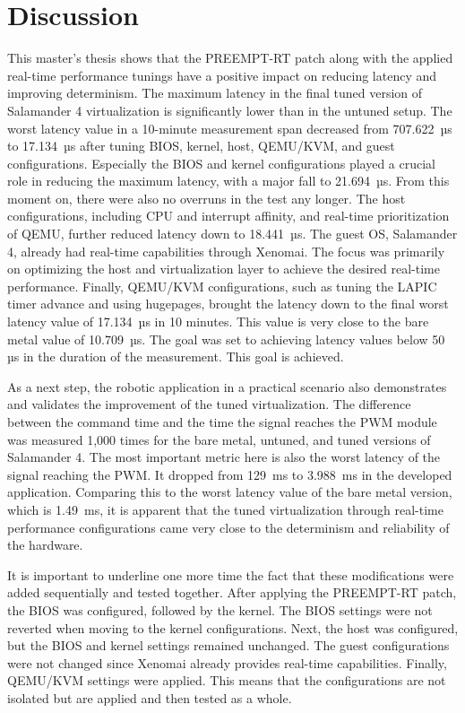 \documentclass[MMR,Master,english]{style/twbook}
\begin{document}
\clearpage

\chapter{Discussion}\label{cha:discussion}
This master's thesis shows that the PREEMPT-RT patch along with the applied real-time performance tunings have a positive impact on reducing latency and improving determinism. The maximum latency in the final tuned version of Salamander 4 virtualization is significantly lower than in the untuned setup. The worst latency value in a 10-minute measurement span decreased from 707.622~µs to 17.134~µs after tuning BIOS, kernel, host, QEMU/KVM, and guest configurations. Especially the BIOS and kernel configurations played a crucial role in reducing the maximum latency, with a major fall to 21.694~µs. From this moment on, there were also no overruns in the test any longer. The host configurations, including CPU and interrupt affinity, and real-time prioritization of QEMU, further reduced latency down to 18.441~µs. The guest OS, Salamander 4, already had real-time capabilities through Xenomai. The focus was primarily on optimizing the host and virtualization layer to achieve the desired real-time performance. Finally, QEMU/KVM configurations, such as tuning the LAPIC timer advance and using hugepages, brought the latency down to the final worst latency value of 17.134~µs in 10 minutes. This value is very close to the bare metal value of 10.709~µs. The goal was set to achieving latency values below 50 µs in the duration of the measurement. This goal is achieved.

\bigskip \noindent As a next step, the robotic application in a practical scenario also demonstrates and validates the improvement of the tuned virtualization. The difference between the command time and the time the signal reaches the PWM module was measured 1,000 times for the bare metal, untuned, and tuned versions of Salamander 4. The most important metric here is also the worst latency of the signal reaching the PWM. It dropped from 129~ms to 3.988~ms in the developed application. Comparing this to the worst latency value of the bare metal version, which is 1.49~ms, it is apparent that the tuned virtualization through real-time performance configurations came very close to the determinism and reliability of the hardware.

\bigskip \noindent It is important to underline one more time the fact that these modifications were added sequentially and tested together. After applying the PREEMPT-RT patch, the BIOS was configured, followed by the kernel. The BIOS settings were not reverted when moving to the kernel configurations. Next, the host was configured, but the BIOS and kernel settings remained unchanged. The guest configurations were not changed since Xenomai already provides real-time capabilities. Finally, QEMU/KVM settings were applied. This means that the configurations are not isolated but are applied and then tested as a whole.
\end{document}
